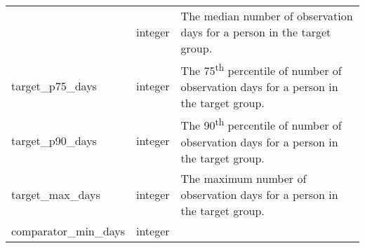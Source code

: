 \documentclass[
]{article}
\begin{document}
\begin{longtable}[]{@{}lll@{}}
\begin{minipage}[t]{0.23\columnwidth}
\end{minipage} & \begin{minipage}[t]{0.18\columnwidth}\raggedright
integer\strut
\end{minipage} & \begin{minipage}[t]{0.50\columnwidth}\raggedright
The median number of observation days for a person in the target
group.\strut
\end{minipage}\tabularnewline
\begin{minipage}[t]{0.23\columnwidth}\raggedright
target\_p75\_days\strut
\end{minipage} & \begin{minipage}[t]{0.18\columnwidth}\raggedright
integer\strut
\end{minipage} & \begin{minipage}[t]{0.50\columnwidth}\raggedright
The 75\textsuperscript{th} percentile of number of observation days for
a person in the target group.\strut
\end{minipage}\tabularnewline
\begin{minipage}[t]{0.23\columnwidth}\raggedright
target\_p90\_days\strut
\end{minipage} & \begin{minipage}[t]{0.18\columnwidth}\raggedright
integer\strut
\end{minipage} & \begin{minipage}[t]{0.50\columnwidth}\raggedright
The 90\textsuperscript{th} percentile of number of observation days for
a person in the target group.\strut
\end{minipage}\tabularnewline
\begin{minipage}[t]{0.23\columnwidth}\raggedright
target\_max\_days\strut
\end{minipage} & \begin{minipage}[t]{0.18\columnwidth}\raggedright
integer\strut
\end{minipage} & \begin{minipage}[t]{0.50\columnwidth}\raggedright
The maximum number of observation days for a person in the target
group.\strut
\end{minipage}\tabularnewline
\begin{minipage}[t]{0.23\columnwidth}\raggedright
comparator\_min\_days\strut
\end{minipage} & \begin{minipage}[t]{0.18\columnwidth}\raggedright
integer\strut
\end{minipage} & \begin{minipage}[t]{0.50\columnwidth}\raggedright

\end{minipage}
\end{longtable}
\end{document}
